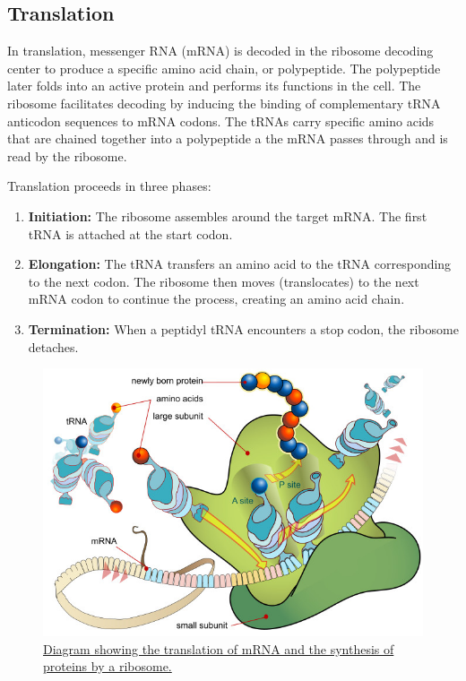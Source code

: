 \hypertarget{translation}{%
\subsection{Translation}\label{translation}}

In translation, messenger RNA (mRNA) is decoded in the ribosome decoding center to produce a specific amino acid chain, or polypeptide. The polypeptide later folds into an active protein and performs its functions in the cell. The ribosome facilitates decoding by inducing the binding of complementary tRNA anticodon sequences to mRNA codons. The tRNAs carry specific amino acids that are chained together into a polypeptide a the mRNA passes through and is read by the ribosome.

Translation proceeds in three phases:

\begin{enumerate}
\def\labelenumi{\arabic{enumi}.}
\tightlist
\item
  \textbf{Initiation:} The ribosome assembles around the target mRNA. The first tRNA is attached at the start codon.
\item
  \textbf{Elongation:} The tRNA transfers an amino acid to the tRNA corresponding to the next codon. The ribosome then moves (translocates) to the next mRNA codon to continue the process, creating an amino acid chain.
\item
  \textbf{Termination:} When a peptidyl tRNA encounters a stop codon, the ribosome detaches.
\end{enumerate}



\begin{figure}

{\centering \includegraphics[width=0.7\linewidth]{./figures/translation/Ribosome_mRNA_translation_en} 

}

\caption{\href{https://commons.wikimedia.org/wiki/File:Ribosome_mRNA_translation_en.svg}{Diagram showing the translation of mRNA and the synthesis of proteins by a ribosome.}}\label{fig:translation}
\end{figure}

